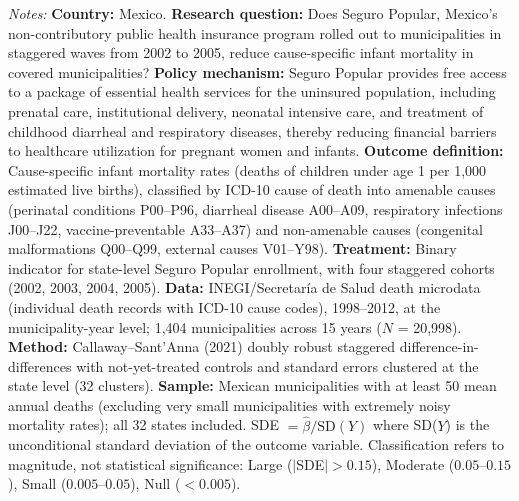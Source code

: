 \begin{table}[H]
\begin{threeparttable}
\begin{tablenotes}[flushleft]
\item[] \parbox{\linewidth}{\textit{Notes:} \textbf{Country:} Mexico. \textbf{Research question:} Does Seguro Popular, Mexico's non-contributory public health insurance program rolled out to municipalities in staggered waves from 2002 to 2005, reduce cause-specific infant mortality in covered municipalities? \textbf{Policy mechanism:} Seguro Popular provides free access to a package of essential health services for the uninsured population, including prenatal care, institutional delivery, neonatal intensive care, and treatment of childhood diarrheal and respiratory diseases, thereby reducing financial barriers to healthcare utilization for pregnant women and infants. \textbf{Outcome definition:} Cause-specific infant mortality rates (deaths of children under age 1 per 1,000 estimated live births), classified by ICD-10 cause of death into amenable causes (perinatal conditions P00--P96, diarrheal disease A00--A09, respiratory infections J00--J22, vaccine-preventable A33--A37) and non-amenable causes (congenital malformations Q00--Q99, external causes V01--Y98). \textbf{Treatment:} Binary indicator for state-level Seguro Popular enrollment, with four staggered cohorts (2002, 2003, 2004, 2005). \textbf{Data:} INEGI/Secretar\'{i}a de Salud death microdata (individual death records with ICD-10 cause codes), 1998--2012, at the municipality-year level; 1,404 municipalities across 15 years ($N$ = 20,998). \textbf{Method:} Callaway--Sant'Anna (2021) doubly robust staggered difference-in-differences with not-yet-treated controls and standard errors clustered at the state level (32 clusters). \textbf{Sample:} Mexican municipalities with at least 50 mean annual deaths (excluding very small municipalities with extremely noisy mortality rates); all 32 states included. SDE $= \hat{\beta} / \text{SD}(Y)$ where SD($Y$) is the unconditional standard deviation of the outcome variable. Classification refers to magnitude, not statistical significance: Large ($|$SDE$| > 0.15$), Moderate ($0.05$--$0.15$), Small ($0.005$--$0.05$), Null ($< 0.005$).}
\end{tablenotes}
\end{threeparttable}
\end{table}
